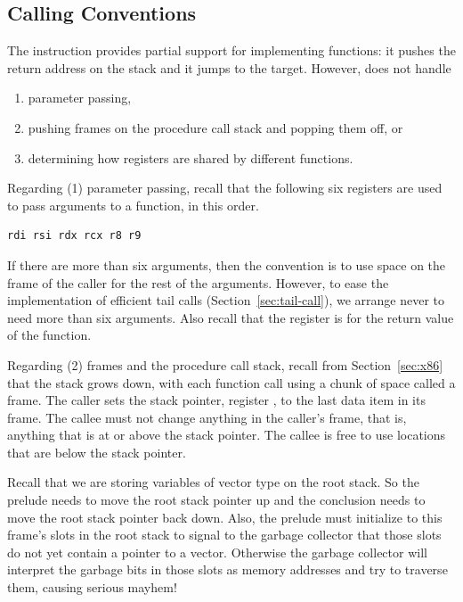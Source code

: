 \documentclass[11pt]{book}
\newcommand{\ocaml}[1]{{\color{blue}{#1}}}
\begin{document}
\subsection{Calling Conventions}


The  instruction provides partial support for implementing
functions: it pushes the return address on the stack and it jumps to
the target. However,  does not handle
\begin{enumerate}
\item parameter passing,
\item pushing frames on the procedure call stack and popping them off,
  or
\item determining how registers are shared by different functions.
\end{enumerate}

Regarding (1) parameter passing, recall that the following six
registers are used to pass arguments to a function, in this order.
\begin{lstlisting}
rdi rsi rdx rcx r8 r9
\end{lstlisting}
If there are
more than six arguments, then the convention is to use space on the
frame of the caller for the rest of the arguments. However, to ease
the implementation of efficient tail calls
(Section~\ref{sec:tail-call}), we arrange never to need more than six
arguments.
%
\ocaml{We'll do this by simply prohibiting functions with more than six
  arguments from passing the type-checker; this is a useful simplification
  even though we will not be implementing efficient tail calls.}
%
Also recall that the register  is for the return value of
the function.


Regarding (2) frames  and the procedure call stack,
 recall from Section~\ref{sec:x86} that
the stack grows down, with each function call using a chunk of space
called a frame. The caller sets the stack pointer, register
, to the last data item in its frame. The callee must not
change anything in the caller's frame, that is, anything that is at or
above the stack pointer. The callee is free to use locations that are
below the stack pointer.

Recall that we are storing variables of vector type on the root stack.
So the prelude needs to move the root stack pointer  up and
the conclusion needs to move the root stack pointer back down.  Also,
the prelude must initialize to  this frame's slots in the root
stack to signal to the garbage collector that those slots do not yet
contain a pointer to a vector. Otherwise the garbage collector will
interpret the garbage bits in those slots as memory addresses and try
to traverse them, causing serious mayhem!
\end{document}
